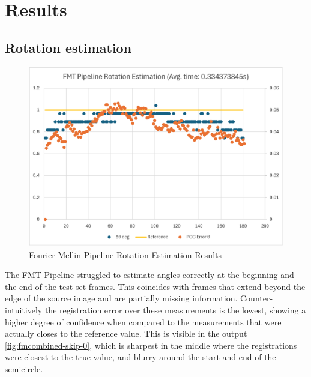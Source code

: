 \chapter{Results}
\label{chap:results}


\section{Rotation estimation}



\begin{figure}[H]
  \centering
  \includegraphics[width=.7\textwidth]{figures/results/rotation-skip-0/FMT-Rotation.png}
  \caption[Fourier-Mellin Pipeline Rotation Estimation Results]{Fourier-Mellin Pipeline Rotation Estimation Results}
  \label{fig:fmresults-skip-0}
\end{figure}


The FMT Pipeline struggled to estimate angles correctly at the beginning and the end of the test set frames. This coincides with frames that extend beyond the edge of the source image and are partially missing information. Counter-intuitively the registration error over these measurements is the lowest, showing a higher degree of confidence when compared to the measurements that were actually closes to the reference value. This is visible in the output \autoref{fig:fmcombined-skip-0}, which is sharpest in the middle where the registrations were closest to the true value, and blurry around the start and end of the semicircle.


